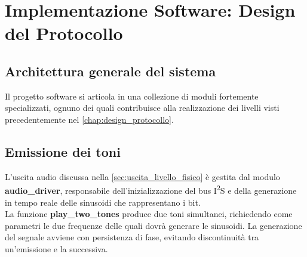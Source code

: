 \chapter{Implementazione Software: Design del Protocollo}
\label{chap:implementazione_software}

\section{Architettura generale del sistema}

Il progetto software si articola in una collezione di moduli fortemente specializzati,
 ognuno dei quali contribuisce alla realizzazione dei livelli visti precedentemente nel \autoref{chap:design_protocollo}.\\

\section{Emissione dei toni}

L’uscita audio discussa nella \autoref{sec:uscita_livello_fisico} è gestita dal modulo \textbf{audio\_driver}, 
responsabile dell’inizializzazione del bus I\textsuperscript{2}S e della generazione in tempo reale delle sinusoidi che rappresentano i bit. \\
La funzione \textbf{play\_two\_tones} produce due toni simultanei, richiedendo come parametri le due frequenze delle quali dovrà generare le sinusoidi.
La generazione del segnale avviene con persistenza di fase, evitando discontinuità tra un’emissione e la successiva. 


